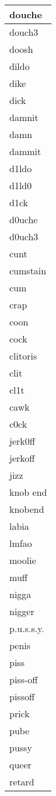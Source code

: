 \begin{longtable}{|l|}
douche \\ \hline 
douch3 \\ \hline 
doosh \\ \hline 
dildo \\ \hline 
dike \\ \hline 
dick \\ \hline 
damnit \\ \hline 
damn \\ \hline 
dammit \\ \hline 
d1ldo \\ \hline 
d1ld0 \\ \hline 
d1ck \\ \hline 
d0uche \\ \hline 
d0uch3 \\ \hline 
cunt \\ \hline 
cumstain \\ \hline 
cum \\ \hline 
crap \\ \hline 
coon \\ \hline 
cock \\ \hline 
clitoris \\ \hline 
clit \\ \hline 
cl1t \\ \hline 
cawk \\ \hline 
c0ck \\ \hline 
jerk0ff \\ \hline 
jerkoff \\ \hline 
jizz \\ \hline 
knob end \\ \hline 
knobend \\ \hline 
labia \\ \hline 
lmfao \\ \hline 
moolie \\ \hline 
muff \\ \hline 
nigga \\ \hline 
nigger \\ \hline 
p.u.s.s.y. \\ \hline 
penis \\ \hline 
piss \\ \hline 
piss-off \\ \hline 
pissoff \\ \hline 
prick \\ \hline 
pube \\ \hline 
pussy \\ \hline 
queer \\ \hline 
retard \\ \hline 

\end{longtable}
